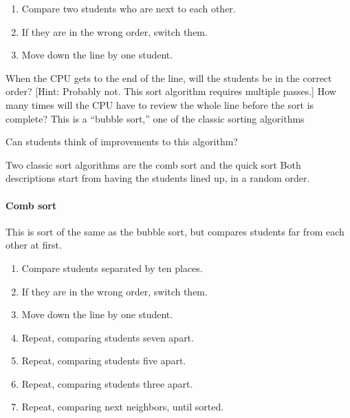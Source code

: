 \documentclass[11pt]{article}
\begin{document}
\begin{enumerate}
\item Compare two students who are next to each other.

\item If they are in the wrong order, switch them.

\item Move down the line by one student.

\end{enumerate}

When the CPU gets to the end of the line, will the students be in the
correct order? [Hint: Probably not.  This sort algorithm requires
multiple passes.]  How many times will the CPU have to review the
whole line before the sort is complete?  This is a ``bubble sort,''
one of the classic sorting algorithms

Can students think of improvements to this algorithm?

Two classic sort algorithms are the comb sort and the quick sort Both
descriptions start from having the students lined up, in a random
order.

\paragraph{Comb sort}

This is sort of the same as the bubble sort, but compares students far
from each other at first.

\begin{enumerate}
\item Compare students separated by ten places.

\item If they are in the wrong order, switch them.

\item Move down the line by one student.

\item Repeat, comparing students seven apart.

\item Repeat, comparing students five apart.

\item Repeat, comparing students three apart.

\item Repeat, comparing next neighbors, until sorted.

\end{enumerate}
\end{document}
